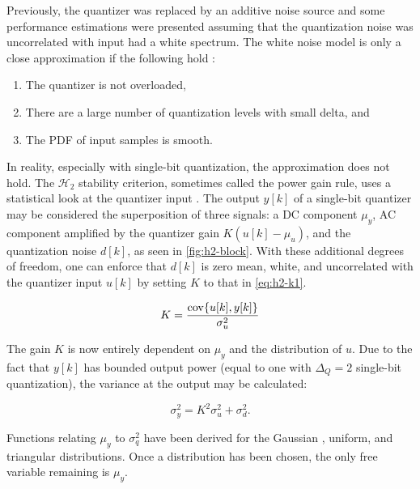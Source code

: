  Previously, the quantizer was replaced by an additive noise source and some performance estimations were presented assuming that the quantization noise was uncorrelated with input had a white spectrum. The white noise model is only a close approximation if the following hold \cite[Ch. 6]{Gray1990}:
 
 \begin{enumerate}
 	\item The quantizer is not overloaded,
 	\item There are a large number of quantization levels with small \gls{delta}, and
 	\item The \gls{PDF} of input samples is smooth.
 \end{enumerate}
 
 In reality, especially with single-bit quantization, the approximation does not hold. The $\mathcal{H}_2$ stability criterion, sometimes called the power gain rule, uses a statistical look at the quantizer input \cite{Risbo1994}. The output $y[k]$ of a single-bit quantizer may be considered the superposition of three signals: a DC component $\mu_y$, AC component amplified by the quantizer gain $K\left(u[k] - \mu_u\right)$, and the quantization noise $d[k]$, as seen in \autoref{fig:h2-block}. With these additional degrees of freedom, one can enforce that $d[k]$ is zero mean, white, and uncorrelated with the quantizer input $u[k]$ by setting $K$ to that in \autoref{eq:h2-k1}.
 
 \begin{equation}
 	K = \frac{\operatorname{cov}\{u[k], y[k]\}}{\sigma_u^2} \label{eq:h2-k1} \\
 \end{equation}
 
 The gain $K$ is now entirely dependent on $\mu_y$ and the distribution of $u$. Due to the fact that $y[k]$ has bounded output power (equal to one with $\Delta_Q=2$ single-bit quantization), the variance at the output may be calculated:
 
 \begin{equation}
 	\sigma_y^2 = K^2\sigma_u^2 + \sigma_d^2.
 \end{equation} 
 
Functions relating $\mu_y$ to $\sigma_q^2$ have been derived for the Gaussian \cite[Eq. 26]{Ardalan1987}, uniform, and triangular \cite[Eq. 6.16, 6.17]{Risbo1994} distributions. Once a distribution has been chosen, the only free variable remaining is $\mu_y$. 

